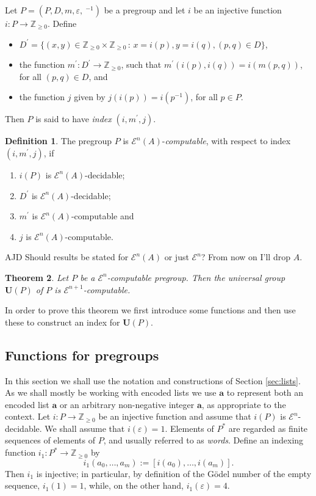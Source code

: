 \documentclass[a4paper]{article}
\newcommand{\grz}[1]{$\mathcal{E}^{#1}$}	%
\newcommand{\ZZ}{\mathbb{Z}}
\newcommand{\maps}{\longrightarrow}
\newcommand\eps{\varepsilon}
\newcommand{\avec}{\mathbf{a}}	%
\newcommand{\Uvec}{\mathbf{U}}	%
\newcommand{\UP}{\Uvec(P)}
\newcommand{\be}{\begin{enumerate}}
\newcommand{\ee}{\end{enumerate}}
\theoremstyle{plain}
\newtheorem{theorem}{Theorem}[section]
\theoremstyle{definition}
\newtheorem{definition}[theorem]{Definition}
\newenvironment{ad}{\noindent\color{blue} AJD }{}
\newcommand{\ajd}[1]{
\begin{ad} #1 \end{ad}}
\begin{document}
Let $P=(P,D,m,\eps,~^{-1})$ be a pregroup and let $i$ be an injective function $i:P\maps \ZZ_{\geq 0}$.
Define 
\begin{itemize}
\item $D^\prime=
\{(x,y)\in \ZZ_{\geq 0}\times \ZZ_{\geq 0}\,:\, x=i(p), y=i(q), (p,q)\in D\}$,
\item 
the function 
$m^\prime:D^\prime \maps \ZZ_{\geq 0}$, such that $m^\prime(i(p),i(q))=i(m(p,q))$, 
for 
all $(p,q)\in D$,  
and 
\item the function $j$  given
by $j(i(p))=i(p^{-1})$, for all $p\in P$.
\end{itemize}
Then $P$ is said to have 
{\em index} $(i,m^\prime,j)$. 
\begin{definition}
The pregroup $P$ is \grz{n}$(A)$-\emph{computable}, with respect to
index $(i,m^\prime,j)$, if 
\be
\item $i(P)$ is \grz{n}$(A)$-decidable;
\item $D^\prime$ is \grz{n}$(A)$-decidable;
\item $m^\prime$ is \grz{n}$(A)$-computable and 
\item $j$ is \grz{n}$(A)$-computable.
\ee
\end{definition}
\ajd{Should results be stated for \grz{n}$(A)$ or just \grz{n}? From now on I'll drop $A$.}


\begin{theorem}\label{thm:UPgrz} Let $P$ be a \grz{n}-computable pregroup. Then the universal group $\UP$ of $P$  
is \grz{n+1}-computable.
\end{theorem}

In order to prove this theorem we first introduce some functions and then use these to construct
an index for $\UP$. 

\subsection{Functions for pregroups}
In this section we shall use the notation and constructions  of
Section \ref{sec:lists}. As we shall mostly be working with encoded lists we use 
$\avec$ to represent both an encoded list $\avec$ or an arbitrary non-negative integer $\avec$, 
as appropriate to
the context. 
Let $i:P\maps \ZZ_{\geq 0}$ be an injective function and assume that $i(P)$ is \grz{n}-decidable.
We shall assume that $i(\eps)=1$.   
Elements of $P^*$ are regarded as finite sequences of elements of $P$, and 
usually referred to as \emph{words}.  Define an indexing function
$i_1:P^*\maps \ZZ_{\geq 0}$ by 
\begin{equation}\label{eq:imonoid}
i_1(a_0,\ldots,a_m):=[i(a_0),\ldots ,i(a_m)].
\end{equation} 
Then $i_1$ is injective; in particular, by definition of the
G\"odel number of the empty sequence,  
$i_1(1)=1$, while,  on the other hand, $i_1(\eps)= 4$.  
\end{document}

